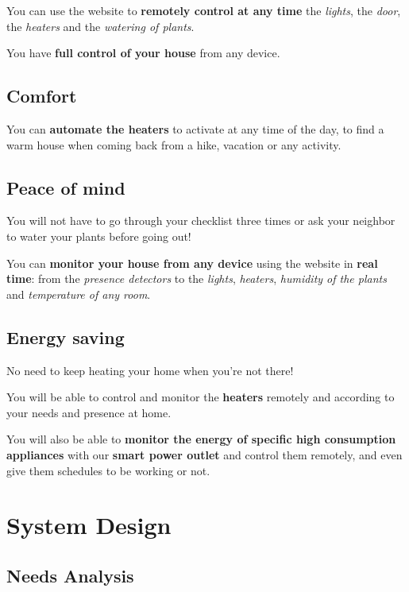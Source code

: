 \documentclass{report}
\begin{document}
        You can use the website to \textbf{remotely control at any time} the \emph{lights}, the \emph{door}, the \emph{heaters} and the \emph{watering of plants}.

        You have \textbf{full control of your house} from any device.

    \section{Comfort}\label{sec:comfort}

        You can \textbf{automate the heaters} to activate at any time of the day, to find a warm house when coming back from a hike, vacation or any activity.

    \section{Peace of mind}\label{sec:peace-of-mind}

        You will not have to go through your checklist three times or ask your neighbor to water your plants before going out!

        You can \textbf{monitor your house from any device} using the website in \textbf{real time}: from the \emph{presence detectors} to the \emph{lights}, \emph{heaters}, \emph{humidity of the plants} and \emph{temperature of any room}.

    \section{Energy saving}\label{sec:energy-saving}

        No need to keep heating your home when you're not there!

        You will be able to control and monitor the \textbf{heaters} remotely and according to your needs and presence at home.

        You will also be able to \textbf{monitor the energy of specific high consumption appliances} with our \textbf{smart power outlet} and control them remotely, and even give them schedules to be working or not.

\chapter{System Design}\label{ch:system-design}

    \section{Needs Analysis}\label{sec:needs-analysis}
\end{document}
